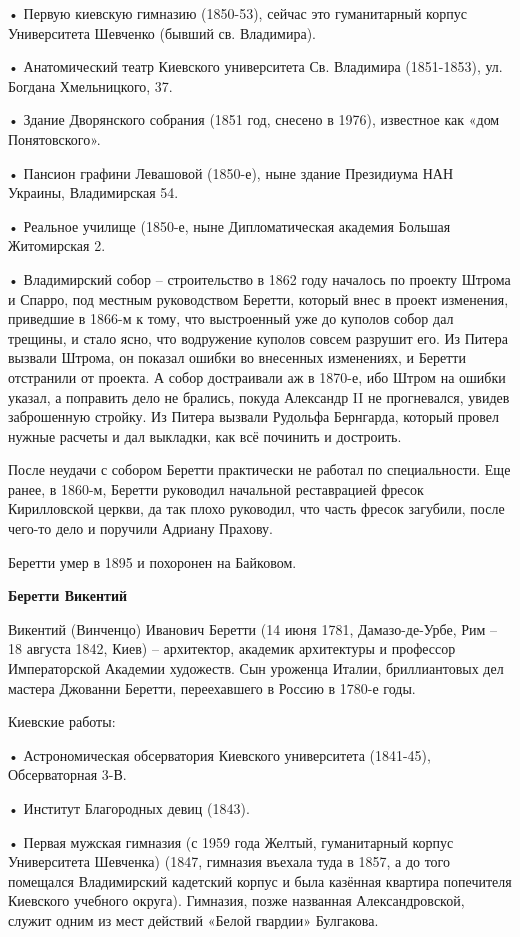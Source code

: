 \noindent • Первую киевскую гимназию (1850-53), сейчас  это гуманитарный корпус Университета Шевченко (бывший св. Владимира).

\noindent • Анатомический театр Киевского университета Св. Владимира (1851-1853), ул. Богдана Хмельницкого, 37.

\noindent • Здание Дворянского собрания (1851 год, снесено в 1976), известное как «дом Понятовского».

\noindent • Пансион графини Левашовой (1850-е), ныне здание Президиума НАН Украины, Владимирская 54.

\noindent • Реальное училище (1850-е, ныне Дипломатическая академия Большая Житомирская 2.

\noindent • Владимирский собор – строительство в 1862 году началось по проекту Штрома и Спарро, под местным руководством Беретти, который внес в проект изменения, приведшие в 1866-м к тому, что выстроенный уже до куполов собор дал трещины, и стало ясно, что водружение куполов совсем разрушит его. Из Питера вызвали Штрома, он показал ошибки во внесенных изменениях, и Беретти отстранили от проекта. А собор достраивали аж в 1870-е, ибо Штром на ошибки указал, а поправить дело не брались, покуда Александр II не прогневался, увидев заброшенную стройку. Из Питера вызвали Рудольфа Бернгарда, который провел нужные расчеты и дал выкладки, как всё починить и достроить. 

После неудачи с собором Беретти практически не работал по специальности. Еще ранее, в 1860-м, Беретти руководил начальной реставрацией фресок Кирилловской церкви, да так плохо руководил, что часть фресок загубили, после чего-то дело и поручили Адриану Прахову.

Беретти умер в 1895 и похоронен на Байковом.\\

\medskip

\textbf{Беретти Викентий}

Викентий (Винченцо) Иванович Беретти (14 июня 1781, Дамазо-де-Урбе, Рим – 18 августа 1842, Киев) – архитектор, академик архитектуры и профессор Императорской Академии художеств. Сын уроженца Италии, бриллиантовых дел мастера Джованни Беретти, переехавшего в Россию в 1780-е годы.

Киевские работы:

\noindent • Астрономическая обсерватория Киевского университета (1841-45), Обсерваторная 3-В. 

\noindent • Институт Благородных девиц  (1843).

\noindent • Первая мужская гимназия (с 1959 года Желтый, гуманитарный корпус Университета Шевченка) (1847, гимназия въехала туда в 1857, а до того помещался Владимирский кадетский корпус и была казённая квартира попечителя Киевского учебного округа). Гимназия, позже названная Александровской, служит одним из мест действий «Белой гвардии» Булгакова.

